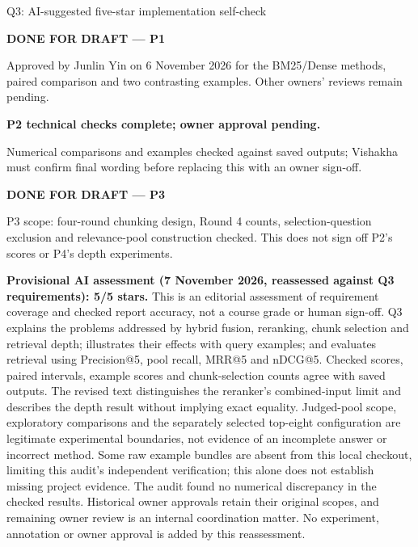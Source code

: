 \begin{review}{Q3: AI-suggested five-star implementation self-check}
\colorbox{yellow!45}{\strut\textbf{DONE FOR DRAFT --- P1}}\par
Approved by Junlin Yin on 6 November 2026 for the BM25/Dense methods, paired comparison and two contrasting examples. Other owners' reviews remain pending.\par\smallskip
\textbf{P2 technical checks complete; owner approval pending.}\par Numerical comparisons and examples checked against saved outputs; Vishakha must confirm final wording before replacing this with an owner sign-off.\par\smallskip
\colorbox{yellow!45}{\strut\textbf{DONE FOR DRAFT --- P3}}\par
P3 scope: four-round chunking design, Round 4 counts, selection-question exclusion and relevance-pool construction checked. This does not sign off P2's scores or P4's depth experiments.\par\smallskip
{}\quad\textbf{Provisional AI assessment (7 November 2026, reassessed against Q3 requirements): 5/5 stars.} This is an editorial assessment of requirement coverage and checked report accuracy, not a course grade or human sign-off. Q3 explains the problems addressed by hybrid fusion, reranking, chunk selection and retrieval depth; illustrates their effects with query examples; and evaluates retrieval using Precision@5, pool recall, MRR@5 and nDCG@5. Checked scores, paired intervals, example scores and chunk-selection counts agree with saved outputs. The revised text distinguishes the reranker's combined-input limit and describes the depth result without implying exact equality. Judged-pool scope, exploratory comparisons and the separately selected top-eight configuration are legitimate experimental boundaries, not evidence of an incomplete answer or incorrect method. Some raw example bundles are absent from this local checkout, limiting this audit's independent verification; this alone does not establish missing project evidence. The audit found no numerical discrepancy in the checked results. Historical owner approvals retain their original scopes, and remaining owner review is an internal coordination matter. No experiment, annotation or owner approval is added by this reassessment.
\end{review}

